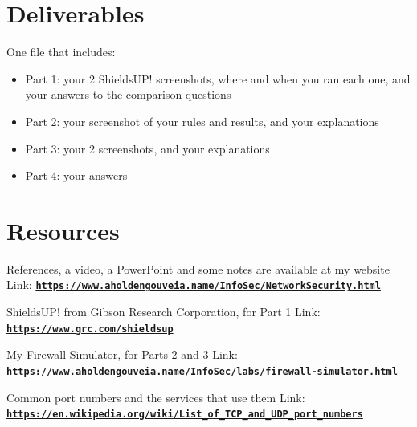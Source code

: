 \documentclass[12pt]{article}
\begin{document}
\section*{Deliverables}
One file that includes:
\begin{itemize}
    \item Part 1: your 2 ShieldsUP! screenshots, where and when you ran each one, and your answers to the comparison questions
    \item Part 2: your screenshot of your rules and results, and your explanations
    \item Part 3: your 2 screenshots, and your explanations
    \item Part 4: your answers
\end{itemize}

\section*{Resources}
References, a video, a PowerPoint and some notes are available at my website
Link: \href{https://www.aholdengouveia.name/InfoSec/NetworkSecurity.html}{\textbf{\nolinkurl{https://www.aholdengouveia.name/InfoSec/NetworkSecurity.html}}}

ShieldsUP! from Gibson Research Corporation, for Part 1
Link: \href{https://www.grc.com/shieldsup}{\textbf{\nolinkurl{https://www.grc.com/shieldsup}}}

My Firewall Simulator, for Parts 2 and 3
Link: \href{https://www.aholdengouveia.name/InfoSec/labs/firewall-simulator.html}{\textbf{\nolinkurl{https://www.aholdengouveia.name/InfoSec/labs/firewall-simulator.html}}}

Common port numbers and the services that use them
Link: \href{https://en.wikipedia.org/wiki/List_of_TCP_and_UDP_port_numbers}{\textbf{\nolinkurl{https://en.wikipedia.org/wiki/List_of_TCP_and_UDP_port_numbers}}}
\end{document}
